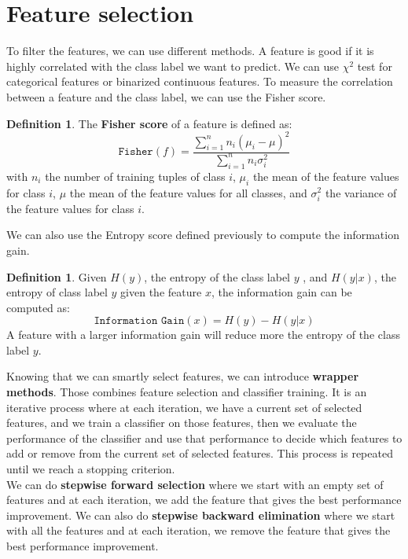 \documentclass[12pt, openany]{report}
\theoremstyle{definition}
\newtheorem{definition}[thm]{Definition}
\begin{document}
\section{Feature selection}
To filter the features, we can use different methods. A feature is good if it is highly correlated with the class label we want to predict. We can use $\chi^2$ test for categorical features or binarized continuous features. To measure the correlation between a feature and the class label, we can use the Fisher score.
\begin{definition}
    The \textbf{Fisher score} of a feature is defined as:
    \begin{equation}
        \texttt{Fisher}(f) = \frac{\sum_{i=1}^{n} n_i (\mu_i - \mu)^2}{\sum_{i=1}^{n} n_i \sigma_i^2}
    \end{equation}
    with $n_i$ the number of training tuples of class $i$, $\mu_i$ the mean of the feature values for class $i$, $\mu$ the mean of the feature values for all classes, and $\sigma_i^2$ the variance of the feature values for class $i$.
\end{definition}
We can also use the Entropy score defined previously to compute the information gain.
\begin{definition}
    Given $H(y)$, the entropy of the class label $y$ , and $H(y |x)$, the entropy of class label $y$ given the feature $x$, the information gain can be computed as:
    \begin{equation}
        \texttt{Information Gain}(x) = H(y) - H(y | x)
    \end{equation}
    A feature with a larger information gain will reduce more the entropy of the class label $y$.
\end{definition}
Knowing that we can smartly select features, we can introduce \textbf{wrapper methods}. Those combines feature selection and classifier training. It is an iterative process where at each iteration, we have a current set of selected features, and we train a classifier on those features, then we evaluate the performance of the classifier and use that performance to decide which features to add or remove from the current set of selected features. This process is repeated until we reach a stopping criterion.\\
We can do \textbf{stepwise forward selection} where we start with an empty set of features and at each iteration, we add the feature that gives the best performance improvement. We can also do \textbf{stepwise backward elimination} where we start with all the features and at each iteration, we remove the feature that gives the best performance improvement. 
\end{document}
